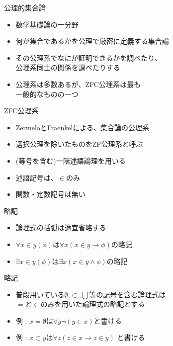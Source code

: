 \documentclass[17pt,aspectratio=169,xcolor=dvipsnames,table,dvipdfmx]{beamer}
\theoremstyle{definition}
\begin{document}
\begin{frame}{公理的集合論}
    \begin{itemize}
        \item 数学基礎論の一分野
        \item 何が集合であるかを公理で厳密に定義する集合論
        \item その公理系でなにが証明できるかを調べたり、\\
              公理系同士の関係を調べたりする
        \item 公理系は多数あるが、ZFC公理系は最も\\一般的なものの一つ
    \end{itemize}
\end{frame}

\begin{frame}{ZFC公理系}
    \begin{itemize}
        \item ZermeloとFraenkelによる、集合論の公理系 %
        \item 選択公理を除いたものをZF公理系と呼ぶ
        \item {\small (等号を含む)}一階述語論理を用いる
        \item 述語記号は、$\in$のみ %
        \item 関数・定数記号は無い %
    \end{itemize}
\end{frame}

\begin{frame}{略記}
    \begin{itemize}
        \item 論理式の括弧は適宜省略する
        \item $\forall x \in y (\phi)$は$\forall x (x \in y \rightarrow \phi)$の略記
        \item $\exists x \in y (\phi)$は$\exists x (x \in y \land \phi)$の略記
    \end{itemize}
\end{frame}

\begin{frame}{略記}
    \begin{itemize}
        \item 普段用いている$\emptyset$,$\subset$,$\bigcup$等の記号を含む論理式は\\
              $=$と$\in$のみを用いた論理式の略記とする
        \item 例 : $x = \emptyset$は$\forall y \neg (y \in x)$と書ける
        \item 例 : $x \subset y$は$\forall z (z \in x \rightarrow z \in y)$ と書ける
    \end{itemize}
\end{frame}
\end{document}
